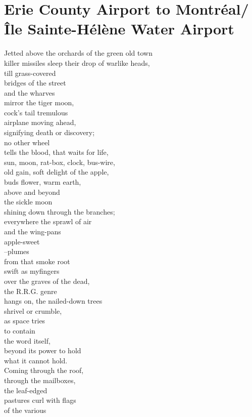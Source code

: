 \documentclass[smalldemyvopaper,11pt,twoside,onecolumn,openright,extrafontsizes]{memoir}
\newlength\drop
\begin{document}
\chapter{Erie County Airport to Montréal/Île Sainte-Hélène Water Airport}
Jetted above the orchards of the green old town
\\killer missiles sleep their drop of warlike heads,
\\till grass-covered
\\bridges of the street
\\and the wharves
\\mirror the tiger moon,
\\cock's tail tremulous
\\airplane moving ahead,
\\signifying death or discovery;
\\no other wheel
\\tells the blood, that waits for life,
\\sun, moon, rat-box, clock, bus-wire,
\\old gain, soft delight of the apple,
\\buds flower, warm earth,
\\above and beyond
\\the sickle moon
\\shining down through the branches;
\\everywhere the sprawl of air
\\and the wing-pans
\\apple-sweet
\\--plumes
\\from that smoke root
\\swift as myfingers
\\over the graves of the dead,
\\the R.R.G. genre
\\hangs on, the nailed-down trees
\\shrivel or crumble,
\\as space tries
\\to contain
\\the word itself,
\\beyond its power to hold
\\what it cannot hold.
\\Coming through the roof,
\\through the mailboxes,
\\the leaf-edged
\\pastures curl with flags
\\of the various
\end{document}
